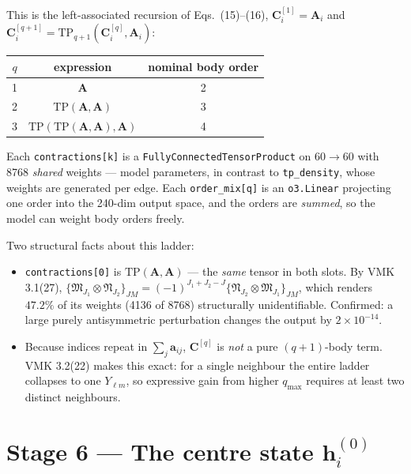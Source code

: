 \documentclass[11pt,a4paper]{article}
\newcommand{\code}[1]{\texttt{\small #1}}
\begin{document}
This is the left-associated recursion of Eqs.~(15)--(16),
$\bm C^{[1]}_i = \bm A_i$ and
$\bm C^{[q+1]}_i = \mathrm{TP}_{q+1}(\bm C^{[q]}_i, \bm A_i)$:

\begin{center}\small
\begin{tabular}{@{}ccc@{}}
\toprule
$q$ & expression & nominal body order \\
\midrule
1 & $\bm A$ & 2 \\
2 & $\mathrm{TP}(\bm A,\bm A)$ & 3 \\
3 & $\mathrm{TP}(\mathrm{TP}(\bm A,\bm A),\bm A)$ & 4 \\
\bottomrule
\end{tabular}
\end{center}

Each \code{contractions[k]} is a \code{FullyConnectedTensorProduct} on
$60\to60$ with 8768 \emph{shared} weights --- model parameters, in contrast to
\code{tp\_density}, whose weights are generated per edge. Each
\code{order\_mix[q]} is an \code{o3.Linear} projecting one order into the 240-dim
output space, and the orders are \emph{summed}, so the model can weight body
orders freely.

Two structural facts about this ladder:

\begin{itemize}\itemsep2pt
\item \code{contractions[0]} is $\mathrm{TP}(\bm A,\bm A)$ --- the \emph{same}
tensor in both slots. By VMK 3.1(27),
$\{\bm{\mathfrak M}_{J_1}\!\otimes\bm{\mathfrak N}_{J_2}\}_{JM}
=(-1)^{J_1+J_2-J}\{\bm{\mathfrak N}_{J_2}\!\otimes\bm{\mathfrak M}_{J_1}\}_{JM}$,
which renders $47.2\%$ of its weights (4136 of 8768) structurally
unidentifiable. Confirmed: a large purely antisymmetric perturbation changes the
output by $2\times10^{-14}$.
\item Because indices repeat in $\sum_j \bm a_{ij}$, $\bm C^{[q]}$ is \emph{not} a
pure $(q{+}1)$-body term. VMK 3.2(22) makes this exact: for a single neighbour the
entire ladder collapses to one $Y_{\ell m}$, so expressive gain from higher
$q_{\max}$ requires at least two distinct neighbours.
\end{itemize}

\section{Stage 6 --- The centre state \texorpdfstring{$\bm h^{(0)}_i$}{h(0)\_i}}
\end{document}
